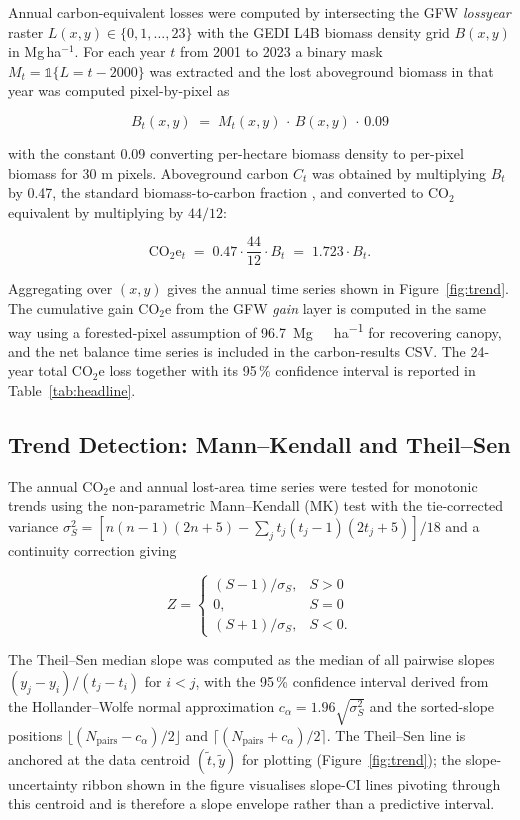 \documentclass[12pt,a4paper]{article}
\begin{document}
Annual carbon-equivalent losses were computed by intersecting the
GFW \emph{lossyear} raster $L(x,y)\in\{0,1,\dots,23\}$ with the GEDI
L4B biomass density grid $B(x,y)$ in Mg\,ha$^{-1}$. For each year
$t$ from 2001 to 2023 a binary mask $M_t = \mathbb{1}\{L = t-2000\}$
was extracted and the lost aboveground biomass in that year was
computed pixel-by-pixel as

\[
B_t(x,y) \;=\; M_t(x,y) \,\cdot\, B(x,y) \,\cdot\, 0.09
\]

with the constant 0.09 converting per-hectare biomass density to
per-pixel biomass for 30 m pixels. Aboveground carbon $C_t$ was
obtained by multiplying $B_t$ by 0.47, the standard biomass-to-carbon
fraction \citep{westlake1963}, and converted to CO$_2$ equivalent by
multiplying by $44/12$:

\[
\text{CO}_2\text{e}_t \;=\; 0.47 \cdot \frac{44}{12} \cdot B_t
\;=\; 1.723 \cdot B_t .
\]

Aggregating over $(x,y)$ gives the annual time series shown in
Figure~\ref{fig:trend}. The cumulative gain CO$_2$e from the GFW
\emph{gain} layer is computed in the same way using a forested-pixel
assumption of \SI{96.7}{\mega\gram\of\dryMatter\per\hectare} for
recovering canopy, and the net balance time series is included in
the carbon-results CSV. The 24-year total CO$_2$e loss together with
its 95\,\% confidence interval is reported in
Table~\ref{tab:headline}.

\subsection{Trend Detection: Mann--Kendall and Theil--Sen}

The annual CO$_2$e and annual lost-area time series were tested for
monotonic trends using the non-parametric Mann--Kendall (MK) test
\citep{mann1945, kendall1975} with the tie-corrected variance
$\sigma_S^2 = [n(n-1)(2n+5) - \sum_j t_j(t_j-1)(2t_j+5)] / 18$ and a
continuity correction giving

\[
Z = \begin{cases}
(S-1)/\sigma_S, & S > 0 \\
0, & S = 0 \\
(S+1)/\sigma_S, & S < 0 .
\end{cases}
\]

The Theil--Sen median slope was computed as the median of all
pairwise slopes $(y_j - y_i)/(t_j - t_i)$ for $i<j$, with the
95\,\% confidence interval derived from the Hollander--Wolfe
normal approximation $c_\alpha = 1.96\sqrt{\sigma_S^2}$ and the
sorted-slope positions $\lfloor (N_{\text{pairs}}-c_\alpha)/2\rfloor$
and $\lceil (N_{\text{pairs}}+c_\alpha)/2\rceil$. The Theil--Sen line
is anchored at the data centroid $(\widetilde{t},\widetilde{y})$ for
plotting (Figure~\ref{fig:trend}); the slope-uncertainty ribbon
shown in the figure visualises slope-CI lines pivoting through this
centroid and is therefore a slope envelope rather than a predictive
interval.
\end{document}
